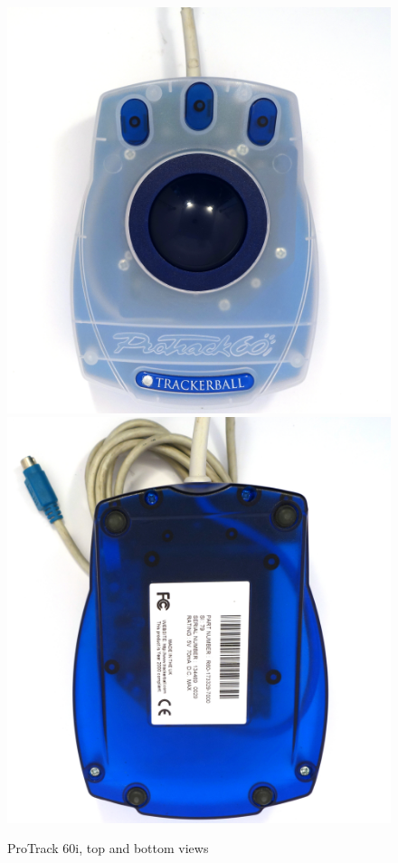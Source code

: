 \documentclass[11pt, a4paper]{article}
\begin{document}
\begin{figure}[h]
    \centering
    \includegraphics[scale=0.35]{1999_protrack_60i/monstr3_60.jpg}
    \includegraphics[scale=0.35]{1999_protrack_60i/monstr4_60.jpg}
    \caption{ProTrack 60i, top and bottom views}
     \label{fig:ProTrack60iTopBottom}
\end{figure}
\end{document}
